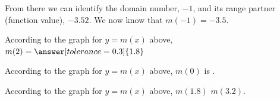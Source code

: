 \documentclass{ximera}
\begin{document}
From there we can identify the domain number, $-1$, and its range partner (function value), $-3.52$. We now know that $m(-1)=-3.5$.




\begin{question}

According to the graph for $y = m(x)$ above, $m(2) = \answer[tolerance=0.3]{1.8}$

\end{question}



\begin{question}

According to the graph for $y = m(x)$ above, $m(0)$ is .

\end{question}



\begin{question}

According to the graph for $y = m(x)$ above, $m(1.8)$  \wordChoice{\choice{$<$}\choice[correct]{$>$}}   $m(3.2)$.

\end{question}
\end{document}
